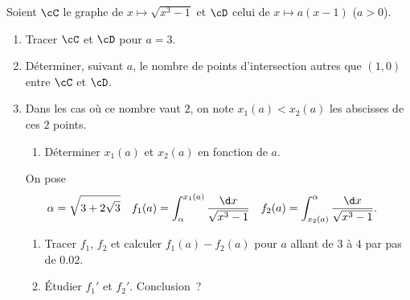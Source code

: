 \begin{enonce}
\begin{exercise}[ID={RMS 124 1280},subtitle={Maple},tags={}]
Soient $\cC$ le graphe de $x\mapsto \sqrt{x^3-1}$ et $\cD$ celui de $x\mapsto
a(x-1)$ ($a>0$).
\begin{enumerate}
  \item Tracer $\cC$ et $\cD$ pour $a=3$.
  \item Déterminer, suivant $a$, le nombre de points d'intersection autres que
    $(1,0)$ entre $\cC$ et $\cD$.
  \item Dans les cas où ce nombre vaut $2$, on note $x_1(a)<x_2(a)$ les
    abscisses de ces $2$ points.
  \begin{enumerate}
    \item Déterminer $x_1(a)$ et $x_2(a)$ en fonction de $a$.
  \end{enumerate}
  On pose
  \begin{align*}
    \alpha &= \sqrt{3+2\sqrt3} &
    f_1(a) &= \int_\alpha^{x_1(a)} \frac{\d x}{\sqrt{x^3-1}} &
    f_2(a) &= \int_{x_2(a)}^\alpha \frac{\d x}{\sqrt{x^3-1}}.
  \end{align*}
  \begin{enumerate}[resume]
    \item Tracer $f_1$, $f_2$ et calculer $f_1(a) - f_2(a)$ pour $a$ allant de
      $3$ à $4$ par pas de $0.02$.
    \item Étudier $f_1'$ et $f_2'$. Conclusion~?
  \end{enumerate}
\end{enumerate}
\end{exercise}
\begin{solution}
\end{solution}
\end{enonce}
